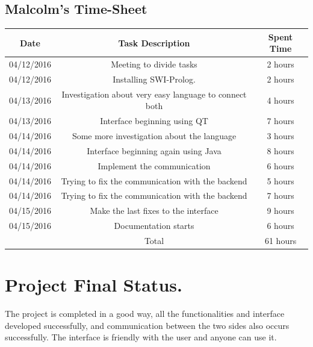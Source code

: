 \documentclass[12pt]{article}
\begin{document}
\subsection{Malcolm's Time-Sheet} 
\begin{center}
\begin{tabular}{ |c|c|c|} 
 \hline
 Date &  Task Description &  Spent Time \\ 
 \hline\hline 
 04/12/2016 & Meeting to divide tasks & 2 hours\\
 04/12/2016 & Installing SWI-Prolog. & 2 hours\\
 04/13/2016 & Investigation about very easy language to connect both & 4 hours\\
 04/13/2016 & Interface beginning using QT & 7 hours\\
 04/14/2016 & Some more investigation about the language & 3 hours\\
 04/14/2016 & Interface beginning again using Java & 8 hours\\
 04/14/2016 & Implement the communication & 6 hours\\
 04/14/2016 & Trying to fix the communication with the backend & 5 hours\\
 04/14/2016 & Trying to fix the communication with the backend & 7 hours\\
 04/15/2016 & Make the last fixes to the interface & 9 hours\\
 04/15/2016 & Documentation starts & 6 hours\\
  \hline
 & Total & 61 hours\\ 
 \hline
\end{tabular}
\end{center}

\section{Project Final Status.}
The project is completed in a good way, all the functionalities and interface developed successfully, and communication between the two sides also occurs successfully. The interface is friendly with the user and anyone can use it.
\end{document}
